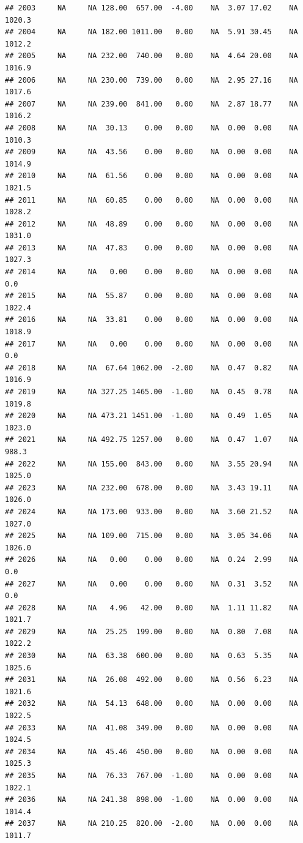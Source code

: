 \documentclass{article}\usepackage{graphicx, color}
\makeatletter
\newenvironment{kframe}{%
 \def\at@end@of@kframe{}%
 \ifinner\ifhmode%
  \def\at@end@of@kframe{\end{minipage}}%
  \begin{minipage}{\columnwidth}%
 \fi\fi%
 \def\FrameCommand##1{\hskip\@totalleftmargin \hskip-\fboxsep
 \colorbox{shadecolor}{##1}\hskip-\fboxsep
     \hskip-\linewidth \hskip-\@totalleftmargin \hskip\columnwidth}%
 \MakeFramed {\advance\hsize-\width
   \@totalleftmargin\z@ \linewidth\hsize
   \@setminipage}}%
 {\par\unskip\endMakeFramed%
 \at@end@of@kframe}
\newenvironment{knitrout}{}{} %
\makeatother
\begin{document}
\begin{knitrout}
\begin{kframe}
\begin{verbatim}
## 2003     NA     NA 128.00  657.00  -4.00    NA  3.07 17.02    NA 1020.3
## 2004     NA     NA 182.00 1011.00   0.00    NA  5.91 30.45    NA 1012.2
## 2005     NA     NA 232.00  740.00   0.00    NA  4.64 20.00    NA 1016.9
## 2006     NA     NA 230.00  739.00   0.00    NA  2.95 27.16    NA 1017.6
## 2007     NA     NA 239.00  841.00   0.00    NA  2.87 18.77    NA 1016.2
## 2008     NA     NA  30.13    0.00   0.00    NA  0.00  0.00    NA 1010.3
## 2009     NA     NA  43.56    0.00   0.00    NA  0.00  0.00    NA 1014.9
## 2010     NA     NA  61.56    0.00   0.00    NA  0.00  0.00    NA 1021.5
## 2011     NA     NA  60.85    0.00   0.00    NA  0.00  0.00    NA 1028.2
## 2012     NA     NA  48.89    0.00   0.00    NA  0.00  0.00    NA 1031.0
## 2013     NA     NA  47.83    0.00   0.00    NA  0.00  0.00    NA 1027.3
## 2014     NA     NA   0.00    0.00   0.00    NA  0.00  0.00    NA    0.0
## 2015     NA     NA  55.87    0.00   0.00    NA  0.00  0.00    NA 1022.4
## 2016     NA     NA  33.81    0.00   0.00    NA  0.00  0.00    NA 1018.9
## 2017     NA     NA   0.00    0.00   0.00    NA  0.00  0.00    NA    0.0
## 2018     NA     NA  67.64 1062.00  -2.00    NA  0.47  0.82    NA 1016.9
## 2019     NA     NA 327.25 1465.00  -1.00    NA  0.45  0.78    NA 1019.8
## 2020     NA     NA 473.21 1451.00  -1.00    NA  0.49  1.05    NA 1023.0
## 2021     NA     NA 492.75 1257.00   0.00    NA  0.47  1.07    NA  988.3
## 2022     NA     NA 155.00  843.00   0.00    NA  3.55 20.94    NA 1025.0
## 2023     NA     NA 232.00  678.00   0.00    NA  3.43 19.11    NA 1026.0
## 2024     NA     NA 173.00  933.00   0.00    NA  3.60 21.52    NA 1027.0
## 2025     NA     NA 109.00  715.00   0.00    NA  3.05 34.06    NA 1026.0
## 2026     NA     NA   0.00    0.00   0.00    NA  0.24  2.99    NA    0.0
## 2027     NA     NA   0.00    0.00   0.00    NA  0.31  3.52    NA    0.0
## 2028     NA     NA   4.96   42.00   0.00    NA  1.11 11.82    NA 1021.7
## 2029     NA     NA  25.25  199.00   0.00    NA  0.80  7.08    NA 1022.2
## 2030     NA     NA  63.38  600.00   0.00    NA  0.63  5.35    NA 1025.6
## 2031     NA     NA  26.08  492.00   0.00    NA  0.56  6.23    NA 1021.6
## 2032     NA     NA  54.13  648.00   0.00    NA  0.00  0.00    NA 1022.5
## 2033     NA     NA  41.08  349.00   0.00    NA  0.00  0.00    NA 1024.5
## 2034     NA     NA  45.46  450.00   0.00    NA  0.00  0.00    NA 1025.3
## 2035     NA     NA  76.33  767.00  -1.00    NA  0.00  0.00    NA 1022.1
## 2036     NA     NA 241.38  898.00  -1.00    NA  0.00  0.00    NA 1014.4
## 2037     NA     NA 210.25  820.00  -2.00    NA  0.00  0.00    NA 1011.7

\end{verbatim}
\end{kframe}
\end{knitrout}
\end{document}
